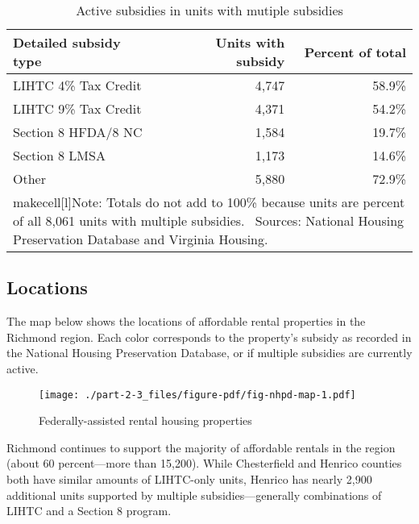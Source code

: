 \documentclass[
  letterpaper,
  DIV=11,
  numbers=noendperiod]{scrreprt}
\begin{document}
\hypertarget{tbl-multiple}{}
\begin{table}
\caption{\label{tbl-multiple}Active subsidies in units with mutiple subsidies }\tabularnewline

\centering
\begin{tabular}{l|r|r}
\hline
Detailed subsidy type & Units with subsidy & Percent of total\\
\hline
LIHTC 4\% Tax Credit & 4,747 & 58.9\%\\
\hline
LIHTC 9\% Tax Credit & 4,371 & 54.2\%\\
\hline
Section 8 HFDA/8 NC & 1,584 & 19.7\%\\
\hline
Section 8 LMSA & 1,173 & 14.6\%\\
\hline
Other & 5,880 & 72.9\%\\
\hline
\multicolumn{3}{l}{\rule{0pt}{1em}makecell[l]{Note: Totals do not add to 100\% because units are percent of all 8,061 units with multiple subsidies. \ Sources: National Housing Preservation Database and Virginia Housing.}}\\
\end{tabular}
\end{table}

\hypertarget{locations}{%
\subsection{Locations}\label{locations}}

The map below shows the locations of affordable rental properties in the
Richmond region. Each color corresponds to the property's subsidy as
recorded in the National Housing Preservation Database, or if multiple
subsidies are currently active.

\begin{figure}

{\centering \texttt{[image: ./part-2-3\_files/figure-pdf/fig-nhpd-map-1.pdf]}

}

\caption{\label{fig-nhpd-map}Federally-assisted rental housing
properties}

\end{figure}

Richmond continues to support the majority of affordable rentals in the
region (about 60 percent---more than 15,200). While Chesterfield and
Henrico counties both have similar amounts of LIHTC-only units, Henrico
has nearly 2,900 additional units supported by multiple
subsidies---generally combinations of LIHTC and a Section 8 program.
\end{document}
